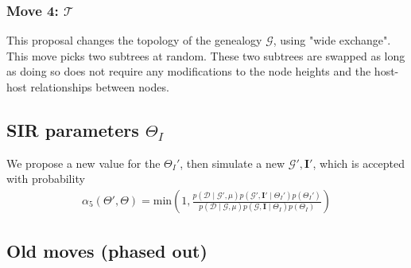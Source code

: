 \documentclass[]{report}
\begin{document}
\subsubsection{Move 4: $\mathcal{T}$}
This proposal changes the topology of the genealogy $\mathcal{G}$, using "wide exchange". This move picks two subtrees at random. These two subtrees are swapped as long as doing so does not require any modifications to the node heights and the host-host relationships between nodes. 
\subsection{SIR parameters $\Theta_{I}$}
We propose a new value for the $\Theta_{I}'$, then simulate a new $\mathcal{G}', \mathbf{I}'$,  which is accepted with probability 
\begin{eqnarray}
\alpha_{5}(\Theta',\Theta)=\textrm{min}\left(1,\frac{p(\mathcal{D}\mid \mathcal{G}', \mu) p(\mathcal{G}', \mathbf{I}' \mid \Theta_{I}')p(\Theta_{I}')}{p(\mathcal{D}\mid \mathcal{G}, \mu ) p(\mathcal{G}, \mathbf{I} \mid \Theta_{I})p(\Theta_I)} \right)
\end{eqnarray}


\subsection{Old moves (phased out)}
\end{document}
